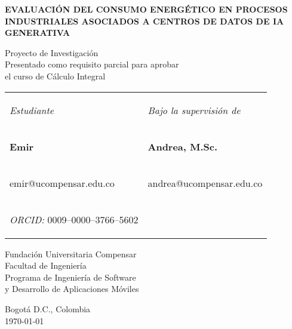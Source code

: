 \begin{titlepage}
\begin{center}
    \vspace*{1cm}
    
    \textbf{\LARGE\MakeUppercase{Evaluación del consumo energético en procesos industriales asociados a centros de datos de IA generativa}}
    
    \vspace{0.4cm}
    
    {\large Proyecto de Investigación}\\
    Presentado como requisito parcial para aprobar\\
    el curso de Cálculo Integral
    
    \vspace{0.6cm}
    
    \renewcommand{\arraystretch}{0.8}
    \begin{tabular}{p{}p{}}
    \begin{center}\textit{Estudiante}\end{center} & 
    \begin{center}\textit{Bajo la supervisión de}\end{center} \\[-0.5cm]
    \begin{center}\textbf{Emir}\end{center} & 
    \begin{center}\textbf{Andrea, M.Sc.}\end{center} \\[-0.5cm]
    \begin{center}emir@ucompensar.edu.co\end{center} & 
    \begin{center}andrea@ucompensar.edu.co\end{center} \\[-0.5cm]
    \begin{center}\textit{ORCID:} 0009--0000--3766--5602\end{center} & \\
    \end{tabular}
    
    \vspace{0.5cm}
    
    {\large Fundación Universitaria Compensar}\\[-0.1cm]
    Facultad de Ingeniería\\[-0.1cm]
    Programa de Ingeniería de Software\\[-0.1cm]
    y Desarrollo de Aplicaciones Móviles
    
    \vfill
    
    Bogotá D.C., Colombia\\
    \today
\end{center}
\end{titlepage}
